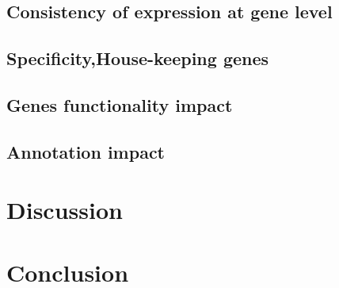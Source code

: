 \subsection{Consistency of expression at gene level}
\subsection{Specificity,House-keeping genes}
\subsection{Genes functionality impact}
\subsection{Annotation impact}



\section{Discussion}
\section{Conclusion}






